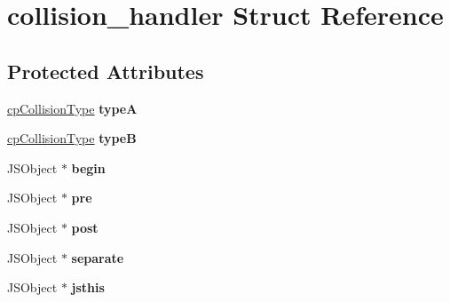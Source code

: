 \hypertarget{structcollision__handler}{\section{collision\-\_\-handler Struct Reference}
\label{structcollision__handler}
}
\subsection*{Protected Attributes}
\begin{DoxyCompactItemize}
\item 
\hypertarget{structcollision__handler_a5ee1fe143aeb0b23cc39fdb07eee9801}{\hyperlink{group__basic_types_gae83e2f50965eb441e36ffff1e32e6d02}{cp\-Collision\-Type} {\bfseries type\-A}}\label{structcollision__handler_a5ee1fe143aeb0b23cc39fdb07eee9801}

\item 
\hypertarget{structcollision__handler_aa9bd5bf6604964d6f39ea8872343a51d}{\hyperlink{group__basic_types_gae83e2f50965eb441e36ffff1e32e6d02}{cp\-Collision\-Type} {\bfseries type\-B}}\label{structcollision__handler_aa9bd5bf6604964d6f39ea8872343a51d}

\item 
\hypertarget{structcollision__handler_a2a2c7a55f93b953fd2be6ca94194f358}{J\-S\-Object $\ast$ {\bfseries begin}}\label{structcollision__handler_a2a2c7a55f93b953fd2be6ca94194f358}

\item 
\hypertarget{structcollision__handler_a05d0a8bce3ca21f548c1f14534e7745d}{J\-S\-Object $\ast$ {\bfseries pre}}\label{structcollision__handler_a05d0a8bce3ca21f548c1f14534e7745d}

\item 
\hypertarget{structcollision__handler_a0a44d7cf05a909023709a989027361c8}{J\-S\-Object $\ast$ {\bfseries post}}\label{structcollision__handler_a0a44d7cf05a909023709a989027361c8}

\item 
\hypertarget{structcollision__handler_a8df7d8b98691486185169fe82721e14d}{J\-S\-Object $\ast$ {\bfseries separate}}\label{structcollision__handler_a8df7d8b98691486185169fe82721e14d}

\item 
\hypertarget{structcollision__handler_a5f02510b6527511c056ebd3ca2ffc458}{J\-S\-Object $\ast$ {\bfseries jsthis}}\label{structcollision__handler_a5f02510b6527511c056ebd3ca2ffc458}


\end{DoxyCompactItemize}
